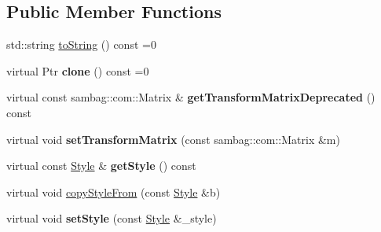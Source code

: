 \subsection*{Public Member Functions}
\begin{DoxyCompactItemize}
\item 
std::string \hyperlink{classsambag_1_1disco_1_1graphic_elements_1_1_graphic_element_a2e07ce40a1a6a929e87dc291de7addff}{toString} () const =0
\item 
\hypertarget{classsambag_1_1disco_1_1graphic_elements_1_1_graphic_element_af833b65108012e121635be881e4ec1bc}{
virtual Ptr {\bfseries clone} () const =0}
\label{classsambag_1_1disco_1_1graphic_elements_1_1_graphic_element_af833b65108012e121635be881e4ec1bc}

\item 
\hypertarget{classsambag_1_1disco_1_1graphic_elements_1_1_graphic_element_a1cd0346f5fd46c7db5060f539ba76324}{
virtual const sambag::com::Matrix \& {\bfseries getTransformMatrixDeprecated} () const }
\label{classsambag_1_1disco_1_1graphic_elements_1_1_graphic_element_a1cd0346f5fd46c7db5060f539ba76324}

\item 
\hypertarget{classsambag_1_1disco_1_1graphic_elements_1_1_graphic_element_a706d3153925e0a4cd46fda299fddfe69}{
virtual void {\bfseries setTransformMatrix} (const sambag::com::Matrix \&m)}
\label{classsambag_1_1disco_1_1graphic_elements_1_1_graphic_element_a706d3153925e0a4cd46fda299fddfe69}

\item 
\hypertarget{classsambag_1_1disco_1_1graphic_elements_1_1_graphic_element_a2b799a6a65dc0c95f25ece24b63a313c}{
virtual const \hyperlink{classsambag_1_1disco_1_1graphic_elements_1_1_style}{Style} \& {\bfseries getStyle} () const }
\label{classsambag_1_1disco_1_1graphic_elements_1_1_graphic_element_a2b799a6a65dc0c95f25ece24b63a313c}

\item 
virtual void \hyperlink{classsambag_1_1disco_1_1graphic_elements_1_1_graphic_element_a2d2553a6d3a539fa8fe8e0d43a1e250e}{copyStyleFrom} (const \hyperlink{classsambag_1_1disco_1_1graphic_elements_1_1_style}{Style} \&b)
\item 
\hypertarget{classsambag_1_1disco_1_1graphic_elements_1_1_graphic_element_aa5b482c9c768d7d5d55ef1970531340d}{
virtual void {\bfseries setStyle} (const \hyperlink{classsambag_1_1disco_1_1graphic_elements_1_1_style}{Style} \&\_\-style)}
\label{classsambag_1_1disco_1_1graphic_elements_1_1_graphic_element_aa5b482c9c768d7d5d55ef1970531340d}


\end{DoxyCompactItemize}
